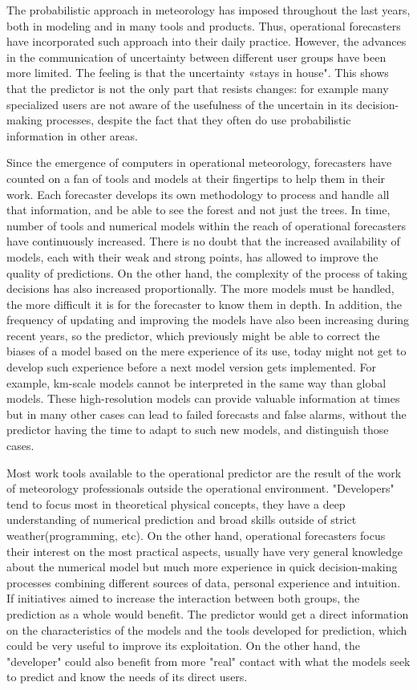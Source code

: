 \documentclass[twocol]{ametsocV5} %
\begin{document}
The probabilistic approach in meteorology has imposed throughout the last years, both in modeling and in many tools and products. Thus, operational forecasters have incorporated such approach into their daily practice. However, the advances in the communication of uncertainty between different user groups have been more limited. The feeling is that the uncertainty «stays in house". This shows that the predictor is not the only part that resists changes: for example many specialized users are not aware of the usefulness of the uncertain in its decision-making processes, despite the fact that they often do use probabilistic information in other areas. 

Since the emergence of computers in operational meteorology, forecasters have counted on a fan of tools and models at their fingertips to help them in their work. Each forecaster develops its own methodology to process and handle all that information, and be able to see the forest and not just the trees. In time, number of tools and numerical models within the reach of operational forecasters have continuously increased. There is no doubt that the increased availability of models, each with their weak and strong points, has allowed to improve the quality of predictions. On the other hand, the complexity of the process of taking decisions has also increased proportionally. The more models must be handled, the more difficult it is for the forecaster to know them in depth. In addition, the frequency of updating and improving the models have also been increasing during recent years, so the predictor, which previously might be able to correct the biases of a model based on the mere experience of its use, today might not get to develop such experience before a next model version gets implemented. For example, km-scale models cannot be interpreted in the same way than global models. These high-resolution models can provide valuable information at times but in many other cases can lead to failed forecasts and false alarms, without the predictor having the time to adapt to such new models, and distinguish those cases.

Most work tools available to the operational predictor are the result of the work of meteorology professionals outside the operational environment. "Developers" tend to focus most in theoretical physical concepts, they have a deep understanding of numerical prediction and broad skills outside of strict weather(programming, etc). On the other hand, operational forecasters focus their interest on the most practical aspects, usually have very general knowledge about the numerical model but much more experience in quick decision-making processes combining different sources of data, personal experience and intuition. If initiatives aimed to increase the interaction between both groups, the prediction as a whole would benefit. The predictor would get a direct information on the characteristics of the models and the tools developed for prediction, which could be very useful to improve its exploitation. On the other hand, the "developer" could also benefit from more "real" contact with what the models seek to predict and know the needs of its direct users.
\end{document}
